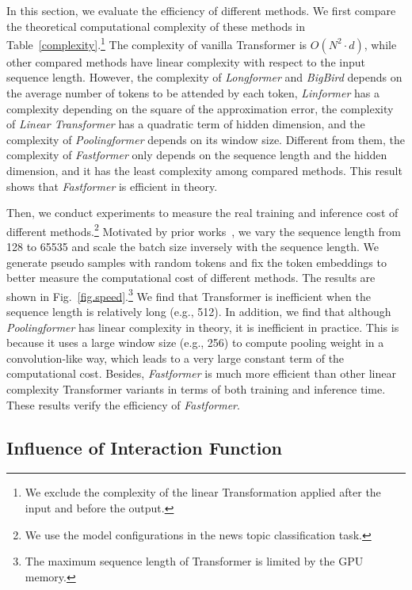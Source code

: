 \documentclass[11pt,a4paper]{article}
\begin{document}
In this section, we evaluate the efficiency of different methods.
We first compare the theoretical computational complexity of these methods in Table~\ref{complexity}.\footnote{We exclude the complexity of the linear Transformation applied after the input and before the output.}
The complexity of vanilla Transformer is $O(N^2\cdot d)$, while other compared methods have linear complexity with respect to the input sequence length.
However, the complexity of \textit{Longformer} and \textit{BigBird} depends on the average number of tokens to be attended by each token, \textit{Linformer} has a complexity depending on the square of the approximation error, the complexity of \textit{Linear Transformer} has a quadratic term of hidden dimension, and the complexity of \textit{Poolingformer} depends on its window size.
Different from them, the complexity of \textit{Fastformer} only depends on the sequence length and the hidden dimension, and it has the least complexity among compared methods.
This result shows that \textit{Fastformer} is efficient in theory.

Then, we conduct experiments to measure the real training and inference cost of different methods.\footnote{We use the model configurations in the news topic classification task.}
Motivated by prior works~\cite{katharopoulos2020transformers,wang2020linformer}, we vary the sequence length from 128 to 65535 and scale the batch size inversely with the sequence length.
We generate pseudo samples with random tokens and fix the token embeddings to better measure the computational cost of different methods.
The results are  shown in Fig.~\ref{fig.speed}.\footnote{The maximum sequence length of Transformer is limited by the GPU memory.}
We find that Transformer is inefficient when the sequence length is relatively long (e.g., 512).
In addition, we find that although \textit{Poolingformer} has linear complexity in theory, it is inefficient in practice.
This is because it uses a large window size (e.g., 256) to compute pooling weight in a convolution-like way, which leads to a very large constant term of the computational cost.
Besides, \textit{Fastformer} is much more efficient than other linear complexity Transformer variants in terms of both training and inference time.
These results verify the efficiency of \textit{Fastformer}.







\subsection{Influence of Interaction Function}
\end{document}
